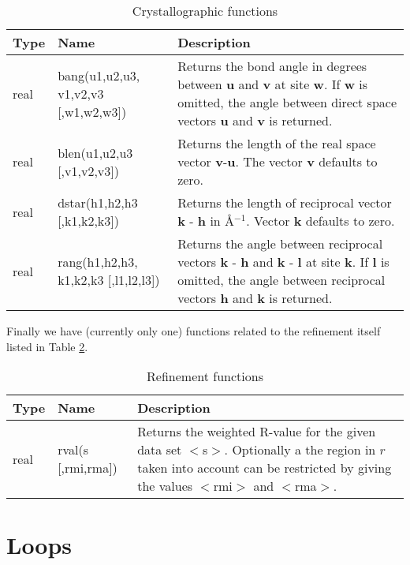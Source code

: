 \begin{table}[!tb]
\centering
\begin{tabularx}{\textwidth}{|p{15mm}|p{30mm}|X|}
  \hline
  {\bf Type} & {\bf Name} & {\bf Description} \\
  \hline
  real & \raggedright bang(u1,u2,u3, v1,v2,v3 [,w1,w2,w3]) &
       Returns the bond angle in degrees between {\bf u} and {\bf v}
       at site {\bf w}. If {\bf w} is omitted, the angle between
       direct space vectors {\bf u} and {\bf v} is returned. \\
  \hline
  real & \raggedright blen(u1,u2,u3 [,v1,v2,v3]) &
       Returns the length of the real space vector {\bf v}-{\bf u}.
       The vector {\bf v} defaults to zero. \\
  \hline
  real & \raggedright dstar(h1,h2,h3 [,k1,k2,k3]) &
       Returns the length of reciprocal vector {\bf k} - {\bf h} in
       \AA$^{-1}$. Vector {\bf k} defaults to zero. \\
  \hline
  real & \raggedright rang(h1,h2,h3, k1,k2,k3 [,l1,l2,l3]) &
       Returns the angle between reciprocal vectors {\bf k} - {\bf h} and
       {\bf k} - {\bf l} at site {\bf k}.  If {\bf l} is omitted, the angle
       between reciprocal vectors {\bf h} and {\bf k} is returned. \\
  \hline
\end{tabularx}
\caption{\label{func-cryst}Crystallographic functions}
\end{table}

Finally we have (currently only one) functions related to the
refinement itself listed in Table \ref{func-fit}.

\begin{table}[!tb]
\centering
\begin{tabularx}{\textwidth}{|p{15mm}|p{30mm}|X|}
  \hline
  {\bf Type} & {\bf Name} & {\bf Description} \\
  \hline
  real & rval(s [,rmi,rma]) &
       Returns the weighted R-value for the given data set $<$s$>$.
       Optionally a the region in $r$ taken into account can be
       restricted by giving the values $<$rmi$>$ and $<$rma$>$. \\
  \hline
\end{tabularx}
\caption{\label{func-fit}Refinement functions}
\end{table}


\section{Loops \label{do}}

